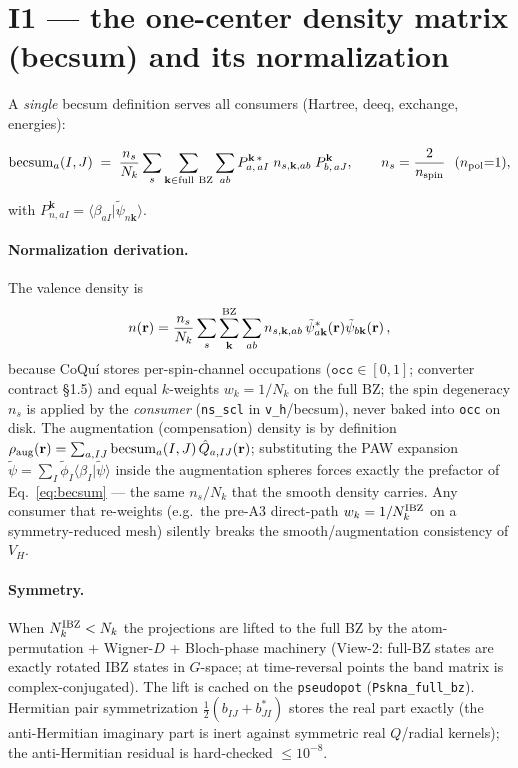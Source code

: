 \documentclass[11pt]{article}
\newcommand{\code}[1]{\texttt{#1}}
\newcommand{\Qhat}{\hat{Q}}
\newcommand{\becsum}{\mathrm{becsum}}
\newcommand{\phit}{\tilde\phi}
\begin{document}
\section{I1 --- the one-center density matrix (becsum) and its
normalization}
\label{sec:becsum}

A \emph{single} becsum definition serves all consumers (Hartree, deeq,
exchange, energies):
\begin{keybox}
\begin{equation}
\becsum_a(I,J) \;=\; \frac{n_s}{N_k}
\sum_{s}\sum_{\mathbf{k}\in\mathrm{full\ BZ}}\sum_{ab}
P^{\mathbf{k}\,*}_{a,\,aI}\; n_{s,\mathbf{k},ab}\; P^{\mathbf{k}}_{b,\,aJ},
\qquad n_s = \frac{2}{n_{\rm spin}}\ \ (n_{\rm pol}{=}1),
\label{eq:becsum}
\end{equation}
\end{keybox}
with $P^{\mathbf{k}}_{n,aI}=\langle\beta_{aI}|\tilde\psi_{n\mathbf{k}}\rangle$.

\paragraph{Normalization derivation.} The valence density is
\begin{equation}
n(\mathbf r) = \frac{n_s}{N_k}\sum_{s}\sum_{\mathbf k}^{\rm BZ}\sum_{ab}
n_{s,\mathbf{k},ab}\,\tilde\psi^*_{a\mathbf k}(\mathbf r)
\tilde\psi_{b\mathbf k}(\mathbf r)\,,
\end{equation}
because CoQu\'i stores per-spin-channel occupations ($\code{occ}\in[0,1]$;
converter contract \S1.5) and equal $k$-weights $w_k=1/N_k$ on the full BZ;
the spin degeneracy $n_s$ is applied by the \emph{consumer}
(\code{ns\_scl} in \code{v\_h}/becsum), never baked into \code{occ} on disk.
The augmentation (compensation) density is by definition
$\rho_{\rm aug}(\mathbf r)=\sum_{a,IJ}\becsum_a(I,J)\,
\Qhat_{a,IJ}(\mathbf r)$; substituting the PAW expansion
$\tilde\psi = \sum_I \phit_I \langle\beta_I|\tilde\psi\rangle$ inside the
augmentation spheres forces exactly the prefactor of
Eq.~\eqref{eq:becsum} --- the same $n_s/N_k$ that the smooth density
carries. Any consumer that re-weights (e.g.\ the pre-A3 direct-path
$w_k=1/N_k^{\rm IBZ}$ on a symmetry-reduced mesh) silently breaks the
smooth/augmentation consistency of $V_H$.

\paragraph{Symmetry.} When $N_k^{\rm IBZ}<N_k$ the projections are lifted to
the full BZ by the atom-permutation + Wigner-$D$ + Bloch-phase machinery
(View-2: full-BZ states are exactly rotated IBZ states in $G$-space; at
time-reversal points the band matrix is complex-conjugated). The lift is
cached on the \code{pseudopot} (\code{Pskna\_full\_bz}). Hermitian pair
symmetrization $\tfrac12(b_{IJ}+b^*_{JI})$ stores the real part exactly
(the anti-Hermitian imaginary part is inert against symmetric real
$Q$/radial kernels); the anti-Hermitian residual is hard-checked
$\le 10^{-8}$.
\end{document}
